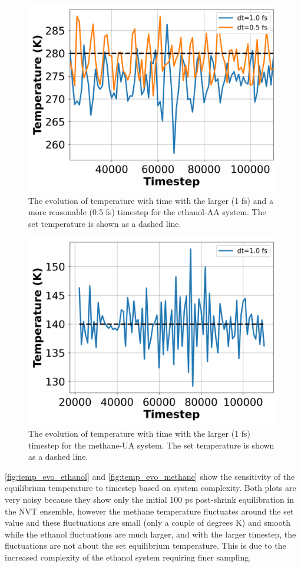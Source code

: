 \begin{figure}[h!]
    \centering
    \includegraphics[width=0.8\linewidth,keepaspectratio]{figures/rep_study/temp_evolution.png}
    \caption{The evolution of temperature with time with the larger (1 fs) and a more reasonable (0.5 fs) timestep for the ethanol-AA system. The set temperature is shown as a dashed line. }\label{fig:temp_evo_ethanol}
\end{figure}
\begin{figure}[h!]
    \centering
    \includegraphics[width=0.8\linewidth,keepaspectratio]{figures/rep_study/temp_evolution_methane.png}
    \caption{The evolution of temperature with time with the larger (1 fs) timestep for the methane-UA system. The set temperature is shown as a dashed line.}\label{fig:temp_evo_methane}
\end{figure}
\autoref{fig:temp_evo_ethanol} and \autoref{fig:temp_evo_methane} show the sensitivity of the equilibrium temperature to timestep based on system complexity. 
Both plots are very noisy because they show only the initial 100 ps post-shrink equilibration in the NVT ensemble, however the methane temperature fluctuates around the set value and these fluctuations are small (only a couple of degrees K) and smooth while the ethanol fluctuations are much larger, and with the larger timestep, the fluctuations are not about the set equilibrium temperature.
This is due to the increased complexity of the ethanol system requiring finer sampling.

